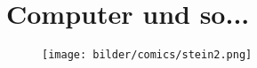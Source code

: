 \section{Computer und so...}

\newpage



\begin{figure}[h]
  \texttt{[image: bilder/comics/stein2.png]}
\end{figure}


